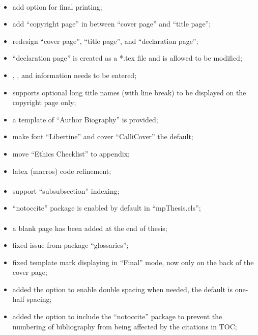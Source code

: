 \paragraph{}
	\begin{itemize}[noitemsep]
		\item add  option for final printing;
		\item add ``copyright page'' in between ``cover page'' and ``title page'';
		\item redesign ``cover page'', ``title page'', and ``declaration page'';
		\item ``declaration page'' is created as a *.tex file and is allowed to be modified;
		\item {}, ,  and  information needs to be entered;
		\item supports optional long title names (with line break) to be displayed on the copyright page only;
		\item a template of ``Author Biography'' is provided;
		\item make font ``Libertine'' and cover ``CalliCover'' the default;
		\item move ``Ethics Checklist'' to appendix;
		\item latex (macros) code refinement;
	\end{itemize}

\paragraph{}
	\begin{itemize}[noitemsep]
		\item support ``subsubsection'' indexing;
		\item ``notoccite'' package is enabled by default in ``mpThesis.cls'';
	\end{itemize}

\paragraph{}
	\begin{itemize}[noitemsep]
		\item a blank page has been added at the end of thesis;
		\item fixed issue from package ``glossaries'';
		\item fixed template mark displaying in ``Final'' mode, now only on the back of the cover page;
		\item added the  option to enable double spacing when needed, the default is one-half spacing;
		\item added the  option to include the ``notoccite'' package to prevent the numbering of bibliography from being affected by the citations in TOC;
	\end{itemize}

